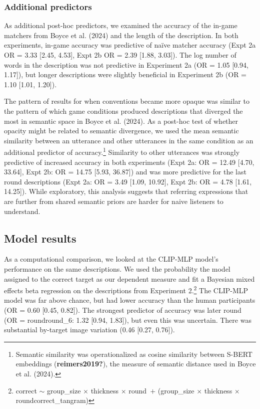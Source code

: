 \documentclass[10pt, letterpaper]{article}
\begin{document}
\subsubsection{Additional predictors}\label{additional-predictors}

As additional post-hoc predictors, we examined the accuracy of the
in-game matchers from Boyce et al. (2024) and the length of the
description. In both experiments, in-game accuracy was predictive of
naïve matcher accuracy (Expt 2a OR = 3.33 {[}2.45, 4.53{]}, Expt 2b OR =
2.39 {[}1.88, 3.03{]}). The log number of words in the description was
not predictive in Experiment 2a (OR = 1.05 {[}0.94, 1.17{]}), but longer
descriptions were slightly beneficial in Experiment 2b (OR = 1.10
{[}1.01, 1.20{]}).

The pattern of results for when conventions became more opaque was
similar to the pattern of which game conditions produced descriptions
that diverged the most in semantic space in Boyce et al. (2024). As a
post-hoc test of whether opacity might be related to semantic
divergence, we used the mean semantic similarity between an utterance
and other utterances in the same condition as an additional predictor of
accuracy.\footnote{Semantic similarity was operationalized as cosine
  similarity between S-BERT embeddings (\textbf{reimers2019?}), the
  measure of semantic distance used in Boyce et al. (2024).} Similarity
to other utterances was strongly predictive of increased accuracy in
both experiments (Expt 2a: OR = 12.49 {[}4.70, 33.64{]}, Expt 2b: OR =
14.75 {[}5.93, 36.87{]}) and was more predictive for the last round
descriptions (Expt 2a: OR = 3.49 {[}1.09, 10.92{]}, Expt 2b: OR = 4.78
{[}1.61, 14.25{]}). While exploratory, this analysis suggests that
referring expressions that are further from shared semantic priors are
harder for naive listeners to understand.

\subsection{Model results}\label{model-results}

As a computational comparison, we looked at the CLIP-MLP model's
performance on the same descriptions. We used the probability the model
assigned to the correct target as our dependent measure and fit a
Bayesian mixed effects beta regression on the descriptions from
Experiment 2.\footnote{correct \({\sim}\) group\_size \({\times}\)
  thickness \({\times}\) round~\({+}\) (group\_size \({\times}\)
  thickness \({\times}\) round\textbar correct\_tangram)} The CLIP-MLP
model was far above chance, but had lower accuracy than the human
participants (OR = 0.60 {[}0.45, 0.82{]}). The strongest predictor of
accuracy was later round (OR = roundround\_6: 1.32 {[}0.94, 1.83{]}),
but even this was uncertain. There was substantial by-target image
variation (0.46 {[}0.27, 0.76{]}).
\end{document}
